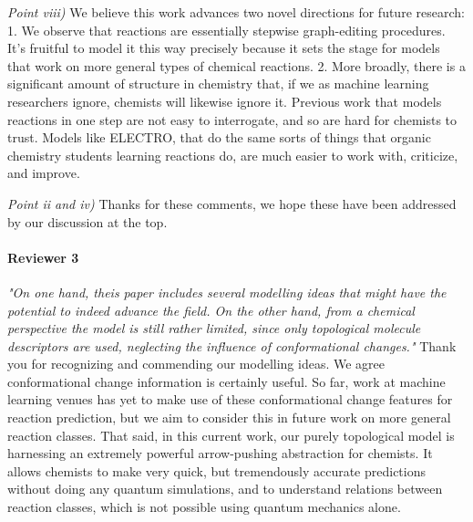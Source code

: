 \documentclass{article}
\begin{document}
\emph{Point viii)}
We believe this work advances two novel directions for future research:
 1. We observe that reactions are essentially stepwise graph-editing procedures. 
 It’s fruitful to model it this way precisely because it sets the stage for models that work on more general types of chemical reactions.
  2. More broadly, there is a significant amount of structure in chemistry that, if we as machine learning researchers ignore, chemists will likewise ignore it. 
  Previous work that models reactions in one step are not easy to interrogate, and so are hard for chemists to trust.
  Models like ELECTRO, that do the same sorts of things that organic chemistry students learning reactions do, are much easier to work with, criticize, and improve.

 
\emph{Point ii and iv)} Thanks for these comments, we hope these have been addressed by our discussion at the top.



\paragraph{Reviewer 3}
\emph{"On one hand, theis paper includes several modelling ideas that might have the potential to indeed advance the field. On the other hand, from a chemical perspective the model is still rather limited, since only topological molecule descriptors are used, neglecting the influence of conformational changes."}
Thank you for recognizing and commending our modelling ideas. We agree conformational change information is certainly useful. So far, work at machine learning venues has yet to make use of these conformational change features for reaction prediction, but we aim to consider this in future work on more general reaction classes. That said, in this current work, our purely topological model is harnessing an extremely powerful arrow-pushing abstraction for chemists. It allows chemists to make very quick, but tremendously accurate predictions without doing any quantum simulations, and to understand relations between reaction classes, which is not possible using quantum mechanics alone. 
\end{document}
